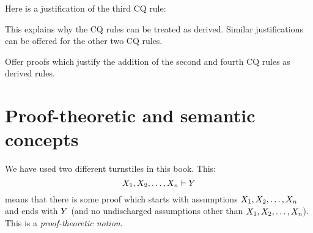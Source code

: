 \begin{fitchproof}
\open
{}
\open
{}
\open
{}
\close
{}
\close
{}
\LEM
\close
{}
\end{fitchproof}


Here is a justification of the third CQ rule:

\begin{fitchproof}
\open
{}
\open
{}
\open
{}

\close
{}
\close
{}
\LEM
\close
{}
\end{fitchproof}


This explains why the CQ rules can be treated as derived. Similar justifications can be offered for the other two CQ rules.

\begin{practiceproblems}

\problempart
Offer proofs which justify the addition of the second and fourth CQ rules as derived rules.


\end{practiceproblems}

\chapter{Proof-theoretic and semantic concepts}
We have used two different turnstiles in this book.  This:
$$X_1, X_2, \ldots, X_n \vdash Y$$
means that there is some proof which starts with assumptions $X_1, X_2, \ldots, X_n$ and ends with $Y$ (and no undischarged assumptions other than $X_1, X_2, \ldots, X_n$). This is a \emph{proof-theoretic notion}.

